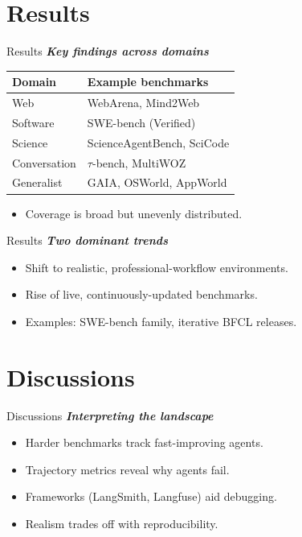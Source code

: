 \documentclass{beamer}
\begin{document}
\section{Results}
\begin{frame}{Results}
\textbf{\textit{Key findings across domains}}
\begin{center}
\footnotesize
\begin{tabular}{@{}ll@{}}
\toprule
\textbf{Domain} & \textbf{Example benchmarks} \\
\midrule
Web & WebArena, Mind2Web \\
Software & SWE-bench (Verified) \\
Science & ScienceAgentBench, SciCode \\
Conversation & $\tau$-bench, MultiWOZ \\
Generalist & GAIA, OSWorld, AppWorld \\
\bottomrule
\end{tabular}
\end{center}
\begin{itemize}
\item Coverage is broad but unevenly distributed.
\end{itemize}
\end{frame}
\begin{frame}{Results}
\textbf{\textit{Two dominant trends}}
\begin{itemize}
\item Shift to realistic, professional-workflow environments.
\item Rise of live, continuously-updated benchmarks.
\item Examples: SWE-bench family, iterative BFCL releases.
\end{itemize}
\end{frame}

\section{Discussions}
\begin{frame}{Discussions}
\textbf{\textit{Interpreting the landscape}}
\begin{itemize}
\item Harder benchmarks track fast-improving agents.
\item Trajectory metrics reveal why agents fail.
\item Frameworks (LangSmith, Langfuse) aid debugging.
\item Realism trades off with reproducibility.
\end{itemize}
\end{frame}
\end{document}
